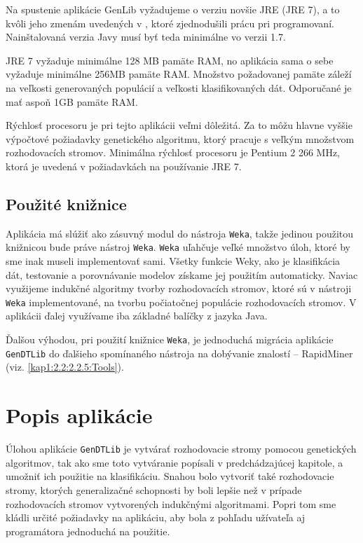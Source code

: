 Na spustenie aplikácie GenLib vyžadujeme o verziu novšie JRE (JRE 7), a to kvôli jeho zmenám uvedených v \cite{online-java}, ktoré zjednodušili prácu pri programovaní. Nainštalovaná verzia Javy musí byť teda minimálne vo verzii 1.7. 

JRE 7 vyžaduje minimálne 128 MB pamäte RAM, no aplikácia sama o sebe vyžaduje minimálne 256MB pamäte RAM. Množstvo požadovanej pamäte záleží na veľkosti generovaných populácií a veľkosti klasifikovaných dát. Odporučané je mať aspoň 1GB pamäte RAM.

Rýchlosť procesoru je pri tejto aplikácii veľmi dôležitá. Za to môžu hlavne vyššie výpočtové požiadavky genetického algoritmu, ktorý pracuje s veľkým množstvom rozhodovacích stromov. Minimálna rýchlosť procesoru je Pentium 2 266 MHz, ktorá je uvedená v požiadavkách na používanie JRE 7.
\subsection{Použité knižnice}\label{kap4:4.1:4.1.4:Libs}
Aplikácia má slúžiť ako zásuvný modul do nástroja \verb|Weka|, takže jedinou použitou knižnicou bude práve nástroj \verb|Weka|. \verb|Weka| uľahčuje veľké množstvo úloh, ktoré by sme inak museli implementovať sami. Všetky funkcie Weky, ako je klasifikácia dát, testovanie a porovnávanie modelov získame jej použitím automaticky. Naviac využijeme indukčné algoritmy tvorby rozhodovacích stromov, ktoré sú v nástroji \verb|Weka| implementované, na tvorbu počiatočnej populácie rozhodovacích stromov. V aplikácii ďalej využívame iba základné balíčky z jazyka Java. 

Ďalšou výhodou, pri použití knižnice \verb|Weka|, je jednoduchá migrácia aplikácie \verb|GenDTLib| do ďalšieho spomínaného nástroja na dobývanie znalostí -- RapidMiner (viz. \ref{kap1:2.2:2.2.5:Tools}).

\section{Popis aplikácie}\label{kap4:4.2:About}
Úlohou aplikácie \verb|GenDTLib| je vytvárať rozhodovacie stromy pomocou genetických algoritmov, tak ako sme toto vytváranie popísali v predchádzajúcej kapitole, a umožniť ich použitie na klasifikáciu. Snahou bolo vytvoriť také rozhodovacie stromy, ktorých generalizačné schopnosti by boli lepšie než v prípade rozhodovacích stromov vytvorených indukčnými algoritmami. Popri tom sme kládli určité požiadavky na aplikáciu, aby bola z pohľadu užívateľa aj programátora jednoduchá na použitie.

